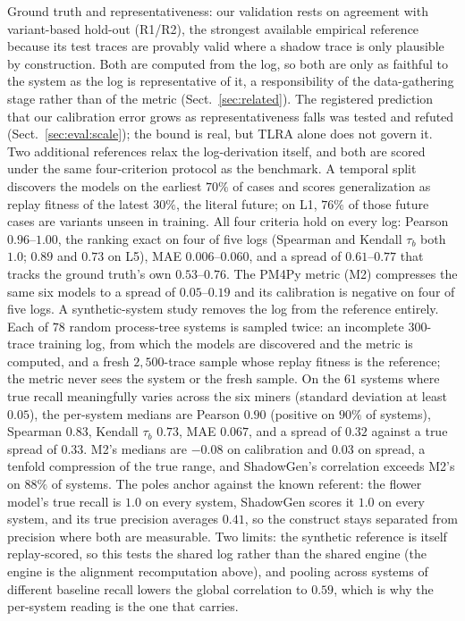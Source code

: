 \documentclass[runningheads]{llncs}
\newcommand{\chg}[1]{#1}
\begin{document}
Ground truth and representativeness: our validation rests on agreement with variant-based hold-out (R1/R2), the strongest available empirical reference because its test traces are provably valid where a shadow trace is only plausible by construction. Both are computed from the log, so both are only as faithful to the system as the log is representative of it, a responsibility of the data-gathering stage rather than of the metric (Sect.~\ref{sec:related}). \chg{The registered prediction that our calibration error grows as representativeness falls was tested and refuted (Sect.~\ref{sec:eval:scale}); the bound is real, but TLRA alone does not govern it.} \chg{Two additional references relax the log-derivation itself, and both are scored under the same four-criterion protocol as the benchmark. A temporal split discovers the models on the earliest $70\%$ of cases and scores generalization as replay fitness of the latest $30\%$, the literal future; on L1, $76\%$ of those future cases are variants unseen in training. All four criteria hold on every log: Pearson $0.96$--$1.00$, the ranking exact on four of five logs (Spearman and Kendall $\tau_b$ both $1.0$; $0.89$ and $0.73$ on L5), MAE $0.006$--$0.060$, and a spread of $0.61$--$0.77$ that tracks the ground truth's own $0.53$--$0.76$. The PM4Py metric (M2) compresses the same six models to a spread of $0.05$--$0.19$ and its calibration is negative on four of five logs. A synthetic-system study removes the log from the reference entirely. Each of $78$ random process-tree systems is sampled twice: an incomplete $300$-trace training log, from which the models are discovered and the metric is computed, and a fresh $2{,}500$-trace sample whose replay fitness is the reference; the metric never sees the system or the fresh sample. On the $61$ systems where true recall meaningfully varies across the six miners (standard deviation at least $0.05$), the per-system medians are Pearson $0.90$ (positive on $90\%$ of systems), Spearman $0.83$, Kendall $\tau_b$ $0.73$, MAE $0.067$, and a spread of $0.32$ against a true spread of $0.33$. M2's medians are $-0.08$ on calibration and $0.03$ on spread, a tenfold compression of the true range, and ShadowGen's correlation exceeds M2's on $88\%$ of systems. The poles anchor against the known referent: the flower model's true recall is $1.0$ on every system, ShadowGen scores it $1.0$ on every system, and its true precision averages $0.41$, so the construct stays separated from precision where both are measurable. Two limits: the synthetic reference is itself replay-scored, so this tests the shared log rather than the shared engine (the engine is the alignment recomputation above), and pooling across systems of different baseline recall lowers the global correlation to $0.59$, which is why the per-system reading is the one that carries.}
\end{document}
